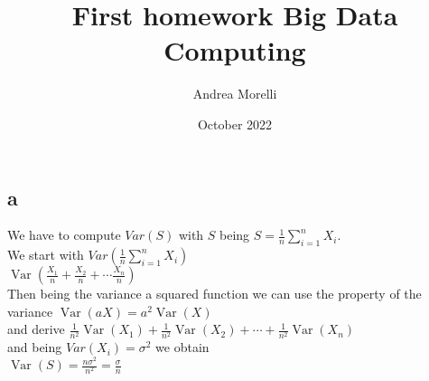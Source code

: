 \documentclass{article}
\title{First homework Big Data Computing}
\author{Andrea Morelli}
\date{October 2022}
\begin{document}
\maketitle

\section{}

\section{}
\subsection{a}
We have to compute $Var(S)$ with $S$ being 
$S=\frac{1}{n} \sum_{i=1}^n X_i$.\\
We start with $Var(\frac{1}{n} \sum_{i=1}^n X_i)$\\
$
\operatorname{Var}\left(\frac{X_1}{n}+\frac{X_2}{n}+\cdots \frac{X_n}{n}\right)
$\\
Then being the variance a squared function we can use the property of the variance $\operatorname{Var}(a X)=a^2 \operatorname{Var}(X)$\\
and derive $\frac{1}{n^2} \operatorname{Var}\left(X_1\right)+\frac{1}{n^2} \operatorname{Var}\left(X_2\right)+\cdots+\frac{1}{n^2} \operatorname{Var}\left(X_n\right)$\\
and being $Var(X_i)=\sigma^2$ we obtain\\
$\operatorname{Var}(S)=\frac{n \sigma^2}{n^2}=\frac{\sigma}{n}$
\end{document}
